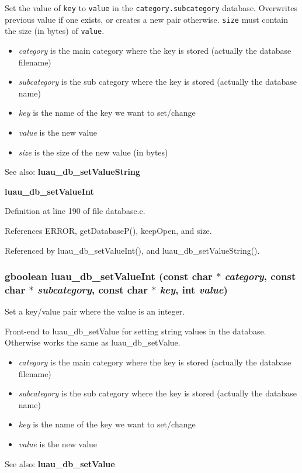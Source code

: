 Set the value of {\tt key} to {\tt value} in the {\tt category.subcategory} database. Overwrites previous value if one exists, or creates a new pair otherwise. {\tt size} must contain the size (in bytes) of {\tt value}.

\begin{itemize}
\item {\em category\/} is the main category where the key is stored (actually the database filename) \item {\em subcategory\/} is the sub category where the key is stored (actually the database name) \item {\em key\/} is the name of the key we want to set/change \item {\em value\/} is the new value \item {\em size\/} is the size of the new value (in bytes)\end{itemize}
\begin{Desc}
\item[See also:]{\bf luau\_\-db\_\-set\-Value\-String} 

{\bf luau\_\-db\_\-set\-Value\-Int} \end{Desc}


Definition at line 190 of file database.c.

References ERROR, get\-Database\-P(), keep\-Open, and size.

Referenced by luau\_\-db\_\-set\-Value\-Int(), and luau\_\-db\_\-set\-Value\-String().
\subsubsection{\setlength{\rightskip}{0pt plus 5cm}gboolean luau\_\-db\_\-set\-Value\-Int (const char $\ast$ {\em category}, const char $\ast$ {\em subcategory}, const char $\ast$ {\em key}, int {\em value})}\label{database_8h_a7}


Set a key/value pair where the value is an integer. 

Front-end to luau\_\-db\_\-set\-Value for setting string values in the database. Otherwise works the same as luau\_\-db\_\-set\-Value.

\begin{itemize}
\item {\em category\/} is the main category where the key is stored (actually the database filename) \item {\em subcategory\/} is the sub category where the key is stored (actually the database name) \item {\em key\/} is the name of the key we want to set/change \item {\em value\/} is the new value\end{itemize}
\begin{Desc}
\item[See also:]{\bf luau\_\-db\_\-set\-Value} \end{Desc}


